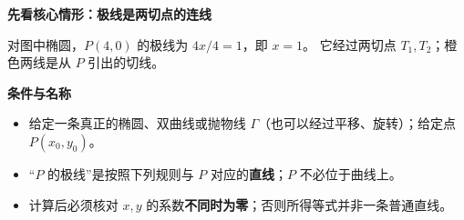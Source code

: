 \begin{statementbox}
\textbf{\textcolor{CStatement}{先看核心情形：极线是两切点的连线}}

\begin{center}

\end{center}
对图中椭圆，$P(4,0)$ 的极线为 $4x/4=1$，即 $x=1$。
它经过两切点 $T_1,T_2$；橙色两线是从 $P$ 引出的切线。
\par\medskip
\textbf{\textcolor{CStatement}{条件与名称}}
\begin{itemize}[leftmargin=*,itemsep=0.35em]
  \item 给定一条真正的椭圆、双曲线或抛物线 $\Gamma$（也可以经过平移、旋转）；给定点 $P(x_0,y_0)$。
  \item “$P$ 的极线”是按照下列规则与 $P$ 对应的\textbf{直线}；$P$ 不必位于曲线上。
  \item 计算后必须核对 $x,y$ 的系数\textbf{不同时为零}；否则所得等式并非一条普通直线。
\end{itemize}


\end{statementbox}
